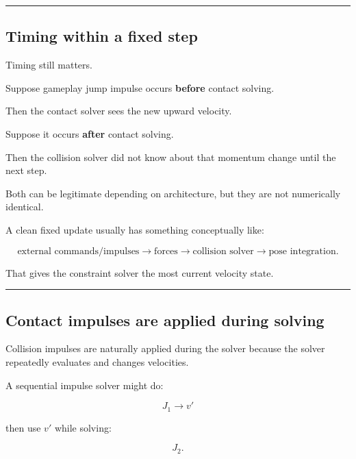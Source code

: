 \begin{center}\rule{0.5\linewidth}{0.5pt}\end{center}

\subsection{Timing within a fixed step}\label{06-engine-ii-ch038-timing-within-a-fixed-step}

\hypertarget{06-engine-ii-ch038-timing-within-a-fixed-step}{}

Timing still matters.

Suppose gameplay jump impulse occurs \textbf{before} contact solving.

Then the contact solver sees the new upward velocity.

Suppose it occurs \textbf{after} contact solving.

Then the collision solver did not know about that momentum change until the next step.

Both can be legitimate depending on architecture, but they are not numerically identical.

A clean fixed update usually has something conceptually like:

\[
\text{external commands/impulses}
\rightarrow
\text{forces}
\rightarrow
\text{collision solver}
\rightarrow
\text{pose integration}.
\]

That gives the constraint solver the most current velocity state.

\begin{center}\rule{0.5\linewidth}{0.5pt}\end{center}

\subsection{Contact impulses are applied during solving}\label{06-engine-ii-ch038-contact-impulses-are-applied-during-solving}

\hypertarget{06-engine-ii-ch038-contact-impulses-are-applied-during-solving}{}

Collision impulses are naturally applied during the solver because the solver repeatedly evaluates and changes velocities.

A sequential impulse solver might do:

\[
J_1
\rightarrow
v'
\]

then use \(v'\) while solving:

\[
J_2.
\]

